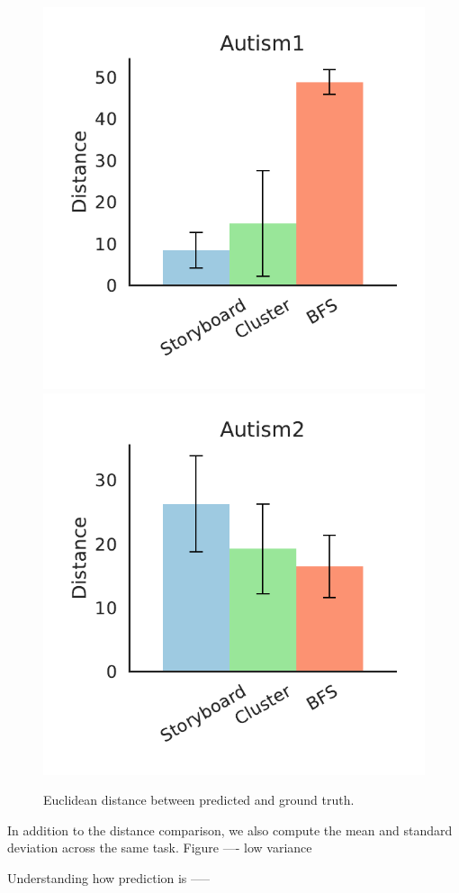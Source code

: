 \begin{figure}[bht]
\includegraphics[scale=0.4]{figures/Autism1.pdf}
\includegraphics[scale=0.4]{figures/Autism2.pdf}
\caption{Euclidean distance between predicted and ground truth.}
\end{figure}
\par In addition to the distance comparison, we also compute the mean and standard deviation across the same task.
Figure ---- low variance 

Understanding how prediction is -----